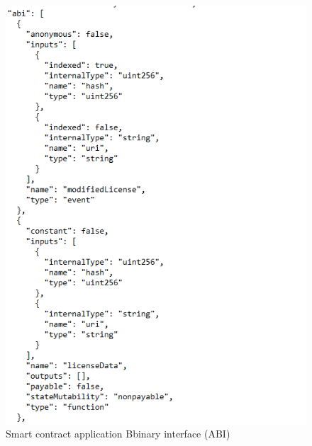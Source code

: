 \begin{center}
	\begin{figure}[htb!]
		
		\begin{minipage}{0.45\linewidth}
			\centering
			\includegraphics[width=1.95\textwidth]{images/chap02_SmartContract_ABI.png}
		\end{minipage}
		\caption[Smart contract application binary interface (ABI)]{Smart contract application Bbinary interface (ABI) }
		
	\end{figure}
	
\end{center}

